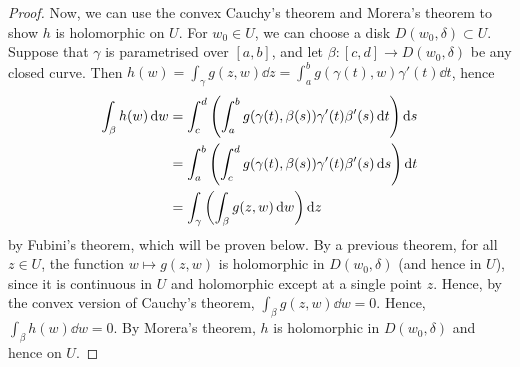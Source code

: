 \begin{proof}
	Now, we can use the convex Cauchy's theorem and Morera's theorem to show \( h \) is holomorphic on \( U \).
	For \( w_0 \in U \), we can choose a disk \( D(w_0, \delta) \subset U \).
	Suppose that \( \gamma \) is parametrised over \( [a,b] \), and let \( \beta \colon [c,d] \to D(w_0,\delta) \) be any closed curve.
	Then \( h(w) = \int_\gamma g(z,w) \dd{z} = \int_a^b g(\gamma(t),w) \gamma'(t) \dd{t} \), hence
	\begin{align*}
		\int_\beta h(w) \dd{w} &= \int_c^d \qty(\int_a^b g(\gamma(t),\beta(s))\gamma'(t)\beta'(s) \dd{t})\dd{s} \\
		&= \int_a^b \qty(\int_c^d g(\gamma(t),\beta(s))\gamma'(t)\beta'(s) \dd{s})\dd{t} \\
		&= \int_\gamma \qty(\int_\beta g(z,w) \dd{w}) \dd{z}
	\end{align*}
	by Fubini's theorem, which will be proven below.
	By a previous theorem, for all \( z \in U \), the function \( w \mapsto g(z,w) \) is holomorphic in \( D(w_0, \delta) \) (and hence in \( U \)), since it is continuous in \( U \) and holomorphic except at a single point \( z \).
	Hence, by the convex version of Cauchy's theorem, \( \int_\beta g(z,w) \dd{w} = 0 \).
	Hence, \( \int_\beta h(w) \dd{w} = 0 \).
	By Morera's theorem, \( h \) is holomorphic in \( D(w_0, \delta) \) and hence on \( U \).
\end{proof}
